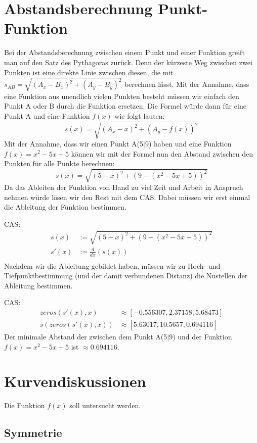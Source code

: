 \documentclass[a4paper,12pt]{article}
\begin{document}
\section{Abstandsberechnung Punkt-Funktion}
Bei der Abstandsberechnung zwischen einem Punkt und einer Funktion greift man auf den Satz des Pythagoras zurück.
Denn der kürzeste Weg zwischen zwei Punkten ist eine direkte Linie zwischen diesen, die mit $s_{AB} = \sqrt{(A_{x}-B_{x})^2 + (A_{y}-B_{y})^2}$ berechnen lässt.
Mit der Annahme, dass eine Funktion aus unendlich vielen Punkten besteht müssen wir einfach den Punkt A oder B durch die Funktion ersetzen. Die Formel würde dann für eine Punkt A und eine Funktion $f(x)$ wie folgt lauten:
$$s(x) = \sqrt{(A_{x}-x)^2+(A_{y}-f(x))^2}$$
Mit der Annahme, dass wir einen Punkt A(5$|$9) haben und eine Funktion $f(x) = x^2 - 5x + 5$ können wir mit der Formel nun den Abstand zwischen den Punkten für alle Punkte berechnen:
$$s(x) = \sqrt{(5-x)^2+(9-(x^2-5x+5))^2}$$
Da das Ableiten der Funktion von Hand zu viel Zeit und Arbeit in Anspruch nehmen würde lösen wir den Rest mit dem CAS.
Dabei müssen wir erst einmal die Ableitung der Funktion bestimmen.

CAS:
\begin{equation*}
\begin{split}
s(x) & := \sqrt{(5-x)^2+(9-(x^2-5x+5))^2}\\
s'(x) & := \frac{d}{dx}(s(x))\\
\end{split}
\end{equation*}
Nachdem wir die Ableitung gebildet haben, müssen wir zu Hoch- und Tiefpunktbestimmung (und der damit verbundenen Distanz) die Nustellen der Ableitung bestimmen.

CAS:
\begin{equation*}
\begin{split}
zeros(s'(x),x) & \approx {[-0.556307,2.37158,5.68473]}\\
s(zeros(s'(x),x)) & \approx {[5.63017,10.5657,\underline{\underline{0.694116}}]}
\end{split}
\end{equation*}
Der minimale Abstand der zwischen dem Punkt A(5$|$9) und der Funktion $f(x) = x^2 - 5x + 5$ ist $\approx{0.694116}$.
\pagebreak
\section{Kurvendiskussionen}
Die Funktion $f(x)$ soll untersucht werden.
\subsection{Symmetrie}
\end{document}
